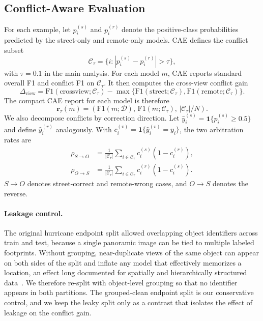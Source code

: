 \documentclass[sigconf]{acmart}
\newcommand{\conf}{\mathcal{C}_{\tau}}
\newcommand{\dview}{\Delta_{\mathrm{view}}}
\begin{document}
\subsection{Conflict-Aware Evaluation}

For each example, let $p_i^{(s)}$ and $p_i^{(r)}$ denote the positive-class
probabilities predicted by the street-only and remote-only models. CAE defines
the conflict subset
\begin{equation}
\conf=\{i: |p_i^{(s)}-p_i^{(r)}|>\tau\},
\end{equation}
with $\tau=0.1$ in the main analysis. For each model $m$, CAE reports standard
overall F1 and conflict F1 on $\conf$. It then computes the cross-view conflict
gain
\begin{equation}
\dview =
\mathrm{F1}(\mathrm{crossview};\conf)
-
\max\{\mathrm{F1}(\mathrm{street};\conf),
\mathrm{F1}(\mathrm{remote};\conf)\}.
\end{equation}
The compact CAE report for each model is therefore
\begin{equation}
\mathbf{r}_{\tau}(m)=
\left(\mathrm{F1}(m;\mathcal{D}),\,
\mathrm{F1}(m;\conf),\, |\conf|/N\right).
\end{equation}
We also decompose conflicts by correction direction. Let
$\hat{y}_i^{(s)}=\mathbf{1}\{p_i^{(s)}\ge0.5\}$ and define $\hat{y}_i^{(r)}$
analogously. With $c_i^{(v)}=\mathbf{1}\{\hat{y}_i^{(v)}=y_i\}$, the two
arbitration rates are
\begin{align}
\rho_{S{\rightarrow}O} &=
\frac{1}{|\conf|}\sum_{i\in\conf}c_i^{(s)}(1-c_i^{(r)}),\\
\rho_{O{\rightarrow}S} &=
\frac{1}{|\conf|}\sum_{i\in\conf}c_i^{(r)}(1-c_i^{(s)}).
\end{align}
$S{\rightarrow}O$ denotes street-correct and remote-wrong cases, and
$O{\rightarrow}S$ denotes the reverse.

\paragraph{Leakage control.}
The original hurricane endpoint split allowed overlapping object identifiers
across train and test, because a single panoramic image can be tied to multiple
labeled footprints. Without grouping, near-duplicate views of the same object
can appear on both sides of the split and inflate any model that effectively
memorizes a location, an effect long documented for spatially and
hierarchically structured data~\cite{roberts2017cross}. We therefore re-split
with object-level grouping so that no identifier appears in both partitions. The
grouped-clean endpoint split is our conservative control, and we keep the leaky
split only as a contrast that isolates the effect of leakage on the conflict
gain.
\end{document}
